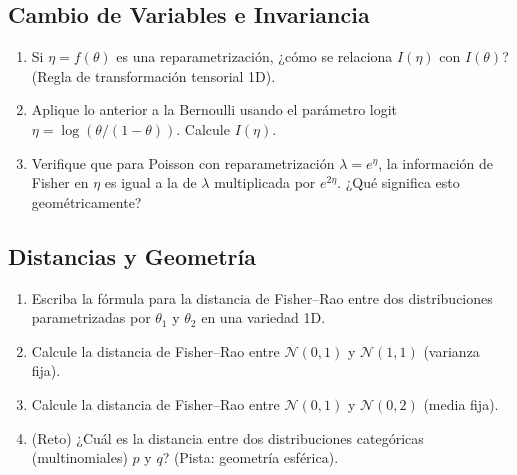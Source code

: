 \subsection*{Cambio de Variables e Invariancia}
\begin{enumerate}[resume]
	\item[$\star\star$] Si $\eta = f(\theta)$ es una reparametrización, ¿cómo se relaciona $I(\eta)$ con $I(\theta)$? (Regla de transformación tensorial 1D).
	\item[$\star\star\star$] Aplique lo anterior a la Bernoulli usando el parámetro logit $\eta = \log(\theta/(1-\theta))$. Calcule $I(\eta)$.
	\item[$\star\star\star$] Verifique que para Poisson con reparametrización $\lambda = e^{\eta}$, la información de Fisher en $\eta$ es igual a la de $\lambda$ multiplicada por $e^{2\eta}$. ¿Qué significa esto geométricamente?
\end{enumerate}

\subsection*{Distancias y Geometría}
\begin{enumerate}[resume]
	\item[$\star\star$] Escriba la fórmula para la distancia de Fisher--Rao entre dos distribuciones parametrizadas por $\theta_1$ y $\theta_2$ en una variedad 1D.
	\item[$\star\star$] Calcule la distancia de Fisher--Rao entre $\mathcal{N}(0, 1)$ y $\mathcal{N}(1, 1)$ (varianza fija).
	\item[$\star\star\star$] Calcule la distancia de Fisher--Rao entre $\mathcal{N}(0, 1)$ y $\mathcal{N}(0, 2)$ (media fija).
	\item[$\star\star\star\star$] (Reto) ¿Cuál es la distancia entre dos distribuciones categóricas (multinomiales) $p$ y $q$? (Pista: geometría esférica).
\end{enumerate}

